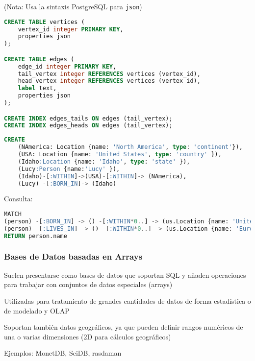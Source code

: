 (Nota: Usa la sintaxis PostgreSQL para \texttt{json})
\begin{lstlisting}[language=SQL]
CREATE TABLE vertices (
	vertex_id integer PRIMARY KEY,
	properties json
);

CREATE TABLE edges (
	edge_id integer PRIMARY KEY,
	tail_vertex integer REFERENCES vertices (vertex_id),
	head_vertex integer REFERENCES vertices (vertex_id),
	label text,
	properties json
);

CREATE INDEX edges_tails ON edges (tail_vertex);
CREATE INDEX edges_heads ON edges (tail_vertex);
\end{lstlisting}
\begin{lstlisting}[language=SQL]
CREATE 
	(NAmerica: Location {name: 'North America', type: 'continent'}),
	(USA: Location {name: 'United States', type: 'country' }),
	(Idaho:Location {name: 'Idaho', type: 'state' }),
	(Lucy:Person {name:'Lucy' }),
	(Idaho)-[:WITHIN]->(USA)-[:WITHIN]-> (NAmerica),
	(Lucy) -[:BORN_IN]-> (Idaho)
\end{lstlisting}
Consulta:
\begin{lstlisting}[language=SQL]
MATCH
(person) -[:BORN_IN] -> () -[:WITHIN*0..] -> (us.Location {name: 'United States'})
(person) -[:LIVES_IN] -> () -[:WITHIN*0..] -> (us.Location {name: 'Europe'})
RETURN person.name
\end{lstlisting}
\subsubsection{Bases de Datos basadas en Arrays}
Suelen presentarse como bases de datos que soportan SQL y añaden operaciones para trabajar con conjuntos de datos especiales (arrays)

Utilizadas para tratamiento de grandes cantidades de datos de forma estadística o de modelado y OLAP

Soportan también datos geográficos, ya que pueden definir rangos numéricos de una o varias dimensiones (2D para cálculos geográficos)

Ejemplos: MonetDB, SciDB, rasdaman